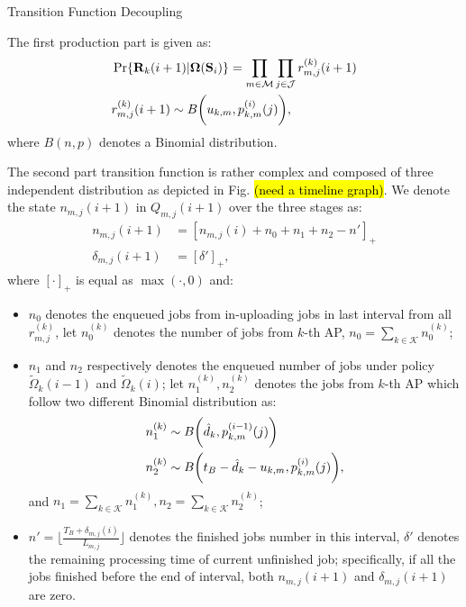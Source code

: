 \documentclass[10pt, conference, letterpaper]{IEEEtran}
\renewcommand{\vec}{\mathbf}
\DeclarePairedDelimiter{\Paren}{\bigg(}{\bigg)}
\newcommand{\apSet}{\mathcal{K}}
\newcommand{\esSet}{\mathcal{M}}
\newcommand{\jSpace}{\mathcal{J}}
\newcommand{\Stat}{\mathbf{S}}
\newcommand{\Policy}{\mathbf{\Omega}}
\begin{document}
    \appendices

    \begin{section}{Transition Function Decoupling}
        \label{trans-decouple}

        The first production part is given as:
        \begin{align*}
            &\Pr\{\vec{R}_k(i+1)|\Policy(\Stat_i)\} = \prod_{m\in\esSet}\prod_{j\in\jSpace} r^{(k)}_{m,j}(i+1)
            \\
            &r^{(k)}_{m,j}(i+1) \sim B\Paren{u_{k,m},p^{(i)}_{k,m}(j)},
        \end{align*}
        where $B(n,p)$ denotes a Binomial distribution.
            
        The second part transition function is rather complex and composed of three independent distribution as depicted in Fig. \hl{(need a timeline graph)}. We denote the state $n_{m,j}(i+1)$ in $Q_{m,j}(i+1)$ over the three stages as:
        \begin{align*}
            n_{m,j}(i+1) &= [n_{m,j}(i) + n_0 + n_1 + n_2 -n']_+
            \\
            \delta_{m,j}(i+1) &= [\delta']_+,
        \end{align*}
        where $[\cdot]_+$ is equal as $\max(\cdot, 0)$ and:
        \begin{itemize}
            \item $n_0$ denotes the enqueued jobs from in-uploading jobs in last interval from all $r^{(k)}_{m,j}$, let $n^{(k)}_0$ denotes the number of jobs from $k$-th AP, $n_0 = \sum_{k\in\apSet} n^{(k)}_0$;
            \item $n_1$ and $n_2$ respectively denotes the enqueued number of jobs under policy $\tilde{\Omega}_k(i-1)$ and $\tilde{\Omega}_k(i)$; let $n^{(k)}_1, n^{(k)}_2$ denotes the jobs from $k$-th AP which follow two different Binomial distribution as:
            \begin{align*}
                n^{(k)}_1 &\sim B\Paren{\hat{d}_k, p^{(i-1)}_{k,m}(j)}
                \\
                n^{(k)}_2 &\sim B\Paren{t_B - \hat{d}_k - u_{k,m}, p^{(i)}_{k,m}(j)},
            \end{align*}
            and $n_1 = \sum_{k\in\apSet}n^{(k)}_1, n_2=\sum_{k\in\apSet}n^{(k)}_2$;
            \item $n' = \lfloor\frac{T_B+\delta_{m,j}(i)}{L_{m,j}}\rfloor$ denotes the finished jobs number in this interval, $\delta'$ denotes the remaining processing time of current unfinished job; specifically, if all the jobs finished before the end of interval, both $n_{m,j}(i+1)$ and $\delta_{m,j}(i+1)$ are zero.

\end{itemize}
\end{section}
\end{document}
